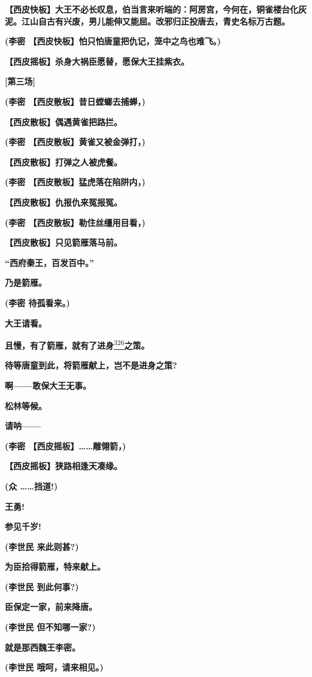 \textbf{【西皮快板】大王不必长叹息，伯当言来听端的：阿房宫，今何在，铜雀楼台化灰泥。江山自古有兴废，男儿能伸又能屈。改邪归正投唐去，青史名标万古题。}

\textbf{(李密 【西皮快板】怕只怕唐童把仇记，笼中之鸟也难飞。)}

\textbf{【西皮摇板】杀身大祸臣愿替，愿保大王挂紫衣。}

\textbf{{[}第三场{]}}

\textbf{(李密 【西皮散板】昔日螳螂去捕蝉，)}

\textbf{【西皮散板】偶遇黄雀把路拦。}

\textbf{(李密 【西皮散板】黄雀又被金弹打，)}

\textbf{【西皮散板】打弹之人被虎餐。}

\textbf{(李密 【西皮散板】猛虎落在陷阱内，)}

\textbf{【西皮散板】仇报仇来冤报冤。}

\textbf{(李密 【西皮散板】勒住丝缰用目看，)}

\textbf{【西皮散板】只见箭雁落马前。}

\textbf{``西府秦王，百发百中。''}

\textbf{乃是箭雁。}

\textbf{(李密 待孤看来。)}

\textbf{大王请看。}

\textbf{且慢，有了箭雁，就有了进身}\protect\hyperlink{fn326}{\textsuperscript{326}}\textbf{之策。}

\textbf{待等唐童到此，将箭雁献上，岂不是进身之策?}

\textbf{啊------敢保大王无事。}

\textbf{松林等候。}

\textbf{请呐------}

\textbf{(李密 【西皮摇板】\ldots{}\ldots{}雕翎箭，)}

\textbf{【西皮摇板】狭路相逢天凑缘。}

\textbf{(众 \ldots{}\ldots{}挡道!)}

\textbf{王勇!}

\textbf{参见千岁!}

\textbf{(李世民 来此则甚?)}

\textbf{为臣拾得箭雁，特来献上。}

\textbf{(李世民 到此何事?)}

\textbf{臣保定一家，前来降唐。}

\textbf{(李世民 但不知哪一家?)}

\textbf{就是那西魏王李密。}

\textbf{(李世民 哦呵，请来相见。)}

